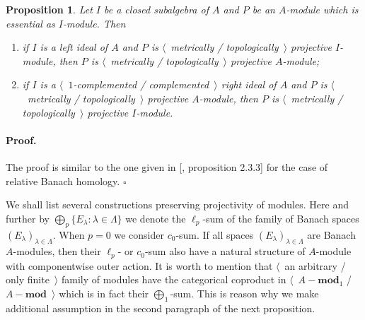 \documentclass[12pt]{article}
\newtheorem{proposition}[theorem]{Proposition}
\renewenvironment{proof}{\paragraph{Proof.}}{\hfill$\square$\medskip}
\begin{document}
\begin{proposition}\label{MetTopProjUnderChangeOfAlg} Let $I$ be a closed
    subalgebra of $A$ and $P$ be an $A$-module which is essential as $I$-module.
    Then
    \begin{enumerate}[label = (\roman*)]
        \item if $I$ is a left ideal of $A$ and $P$ is $\langle$~metrically /
              topologically~$\rangle$  projective $I$-module, then $P$ is
              $\langle$~metrically / topologically~$\rangle$ projective
              $A$-module;
        \item if $I$ is a $\langle$~$1$-complemented / complemented~$\rangle$
              right ideal of $A$ and $P$ is $\langle$~metrically /
              topologically~$\rangle$ projective $A$-module, then $P$ is
              $\langle$~metrically / topologically~$\rangle$ projective
              $I$-module.
    \end{enumerate}

\end{proposition}
\begin{proof} The proof is similar to the one given
    in [\cite{RamsHomPropSemgroupAlg}, proposition 2.3.3]
    for the case of relative Banach homology.
\end{proof}

We shall list several constructions preserving projectivity of modules. Here and
further by $\bigoplus_p\{E_\lambda:\lambda\in\Lambda \}$ we denote the
$\ell_p$-sum of the family of Banach spaces ${(E_\lambda)}_{\lambda\in\Lambda}$.
When $p=0$ we consider $c_0$-sum. If all spaces
${(E_\lambda)}_{\lambda\in\Lambda}$ are Banach $A$-modules, then their $\ell_p$-
or $c_0$-sum also have a natural structure of $A$-module with componentwise
outer action. It is worth to mention that $\langle$~an arbitrary / only
finite~$\rangle$ family of modules have the categorical coproduct in
$\langle$~$A-\mathbf{mod}_1$ / $A-\mathbf{mod}$~$\rangle$ which is in fact their
$\bigoplus_1$-sum. This is reason why we make additional assumption in the
second paragraph of the next proposition.
\end{document}
